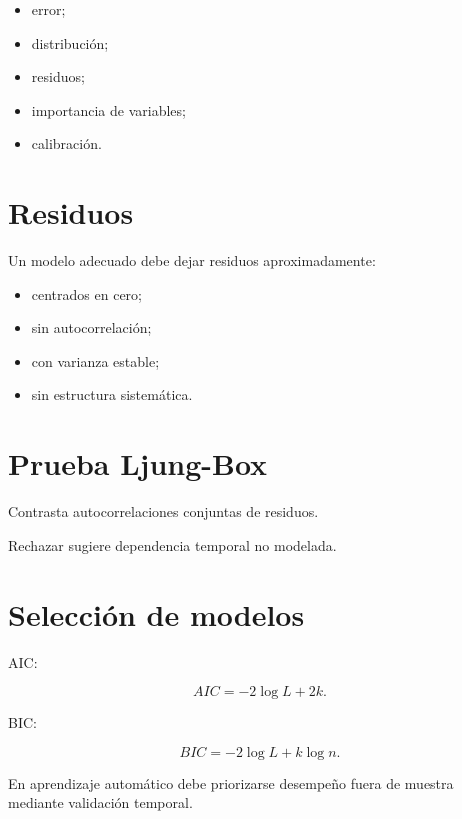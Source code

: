 \documentclass[
  spanish,
  10.5pt,
  letterpaper,
  DIV=11,
  numbers=noendperiod,
  oneside,
  open=any]{scrreprt}
\providecommand{\tightlist}{%
  \setlength{\itemsep}{0pt}\setlength{\parskip}{0pt}}
\theoremstyle{definition}
\theoremstyle{definition}
\theoremstyle{plain}
\theoremstyle{remark}
\begin{document}
\begin{itemize}
\tightlist
\item
  error;
\item
  distribución;
\item
  residuos;
\item
  importancia de variables;
\item
  calibración.
\end{itemize}

\section*{Residuos}\label{residuos-1}


Un modelo adecuado debe dejar residuos aproximadamente:

\begin{itemize}
\tightlist
\item
  centrados en cero;
\item
  sin autocorrelación;
\item
  con varianza estable;
\item
  sin estructura sistemática.
\end{itemize}

\section*{Prueba Ljung-Box}\label{prueba-ljung-box}


Contrasta autocorrelaciones conjuntas de residuos.

Rechazar sugiere dependencia temporal no modelada.

\section*{Selección de modelos}\label{selecciuxf3n-de-modelos-2}


AIC:

\[
AIC=-2\log L+2k.
\]

BIC:

\[
BIC=-2\log L+k\log n.
\]

En aprendizaje automático debe priorizarse desempeño fuera de muestra
mediante validación temporal.
\end{document}
